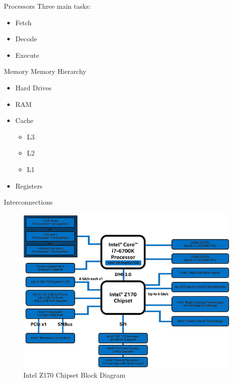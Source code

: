 \documentclass[serif,mathserif,compress]{beamer}
\begin{document}
\begin{frame}{Processors}
  Three main tasks:
  \begin{itemize}
  \item<1-> Fetch 
  \item<1-> Decode 
  \item<1-> Execute 
  \end{itemize}
\end{frame}

\begin{frame}{Memory}
  Memory Hierarchy
  \begin{itemize}
  \item<1-> Hard Drives 
  \item<3-> RAM 
  \item<5-> Cache 
    \begin{itemize}
    \item<7-> L3 
    \item<7-> L2 
    \item<7-> L1 
    \end{itemize}
  \item<9-> Registers
  \end{itemize}
\end{frame}

\begin{frame}{Interconnections}
  \begin{figure}
  \centering
  \includegraphics[height=0.65\textheight]{images/Intel-Z170-chipset-block-diagram.jpg}
  \caption{Intel Z170 Chipset Block Diagram}
  \label{fig:intel-z170-chipset}
  \end{figure}
\end{frame}
\end{document}

